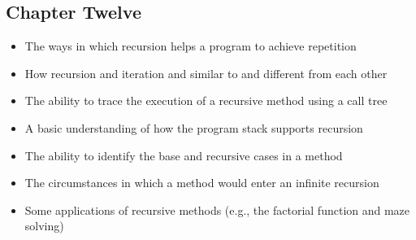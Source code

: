 \vspace*{-.2in}
\subsection*{Chapter Twelve}
\vspace*{-.05in}

\begin{itemize}

  \itemsep -.015in
  \item The ways in which recursion helps a program to achieve repetition
  \item How recursion and iteration and similar to and different from each other
  \item The ability to trace the execution of a recursive method using a call tree
  \item A basic understanding of how the program stack supports recursion
  \item The ability to identify the base and recursive cases in a method
  \item The circumstances in which a method would enter an infinite recursion
  \item Some applications of recursive methods (e.g., the factorial function and maze solving)

\end{itemize}




